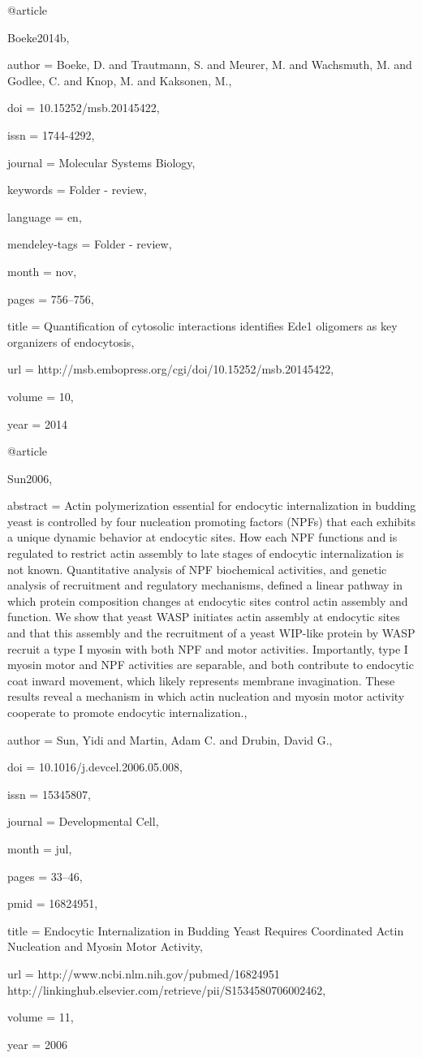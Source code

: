 @article{Boeke2014b,

author = {Boeke, D. and Trautmann, S. and Meurer, M. and Wachsmuth, M. and Godlee, C. and Knop, M. and Kaksonen, M.},

doi = {10.15252/msb.20145422},

issn = {1744-4292},

journal = {Molecular Systems Biology},

keywords = {Folder - review},

language = {en},

mendeley-tags = {Folder - review},

month = {nov},

pages = {756--756},

title = {{Quantification of cytosolic interactions identifies Ede1 oligomers as key organizers of endocytosis}},

url = {http://msb.embopress.org/cgi/doi/10.15252/msb.20145422},

volume = {10},

year = {2014}

}

@article{Sun2006,

abstract = {Actin polymerization essential for endocytic internalization in budding yeast is controlled by four nucleation promoting factors (NPFs) that each exhibits a unique dynamic behavior at endocytic sites. How each NPF functions and is regulated to restrict actin assembly to late stages of endocytic internalization is not known. Quantitative analysis of NPF biochemical activities, and genetic analysis of recruitment and regulatory mechanisms, defined a linear pathway in which protein composition changes at endocytic sites control actin assembly and function. We show that yeast WASP initiates actin assembly at endocytic sites and that this assembly and the recruitment of a yeast WIP-like protein by WASP recruit a type I myosin with both NPF and motor activities. Importantly, type I myosin motor and NPF activities are separable, and both contribute to endocytic coat inward movement, which likely represents membrane invagination. These results reveal a mechanism in which actin nucleation and myosin motor activity cooperate to promote endocytic internalization.},

author = {Sun, Yidi and Martin, Adam C. and Drubin, David G.},

doi = {10.1016/j.devcel.2006.05.008},

issn = {15345807},

journal = {Developmental Cell},

month = {jul},

pages = {33--46},

pmid = {16824951},

title = {{Endocytic Internalization in Budding Yeast Requires Coordinated Actin Nucleation and Myosin Motor Activity}},

url = {http://www.ncbi.nlm.nih.gov/pubmed/16824951 http://linkinghub.elsevier.com/retrieve/pii/S1534580706002462},

volume = {11},

year = {2006}

}

